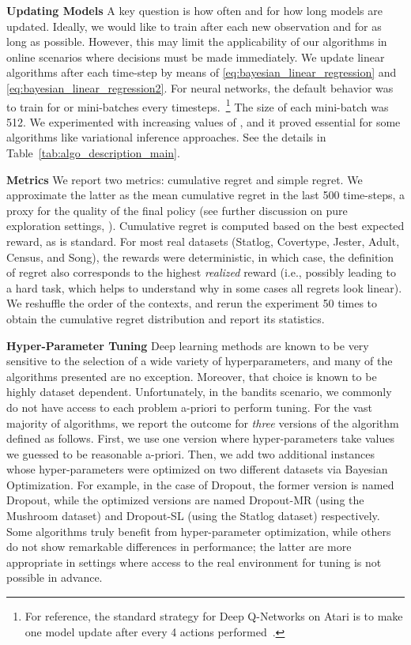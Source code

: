 \documentclass{article} \usepackage{iclr2018_conference,times}
\begin{document}
\textbf{Updating Models}
A key question is how often and for how long models are updated.
Ideally, we would like to train after each new observation and for as long as possible.
However, this may limit the applicability of our algorithms in online scenarios where decisions must be made immediately.
We update linear algorithms after each time-step by means of \eqref{eq:bayesian_linear_regression} and \eqref{eq:bayesian_linear_regression2}.
For neural networks, the default behavior was to train for  or  mini-batches every  timesteps.~\footnote{For reference, the standard strategy for Deep Q-Networks on Atari is to make one model update after every 4 actions performed~\citep{mnih2015,osband2016deep,Plappert17,Fortunato2017}.}
The size of each mini-batch was 512.
We experimented with increasing values of , and it proved essential for some algorithms like variational inference approaches.
See the details in Table~\ref{tab:algo_description_main}.

\textbf{Metrics}  We report two metrics: cumulative regret and simple regret.
We approximate the latter as the mean cumulative regret in the last 500 time-steps, a proxy for the quality of the final policy (see further discussion on pure exploration settings, \cite{bubeck2009pure}).
Cumulative regret is computed based on the best expected reward, as is standard.
For most real datasets (Statlog, Covertype, Jester, Adult, Census, and Song), the rewards were deterministic, in which case, the definition of regret also corresponds to the highest \emph{realized} reward (i.e., possibly leading to a hard task, which helps to understand why in some cases all regrets look linear).
We reshuffle the order of the contexts, and rerun the experiment 50 times to obtain the cumulative regret distribution and report its statistics.


\textbf{Hyper-Parameter Tuning} Deep learning methods are known to be very sensitive to the selection of a wide variety of hyperparameters, and many of the algorithms presented are no exception.  Moreover, that choice is known to be highly dataset dependent.  Unfortunately, in the bandits scenario, we commonly do not have access to each problem a-priori to perform tuning.
For the vast majority of algorithms, we report the outcome for \emph{three} versions of the algorithm defined as follows.
First, we use one version where hyper-parameters take values we guessed to be reasonable a-priori.
Then, we add two additional instances whose hyper-parameters were optimized on two different datasets via Bayesian Optimization.
For example, in the case of Dropout, the former version is named Dropout, while the optimized versions are named Dropout-MR (using the Mushroom dataset) and Dropout-SL (using the Statlog dataset) respectively.
Some algorithms truly benefit from hyper-parameter optimization, while others do not show remarkable differences in performance; the latter are more appropriate in settings where access to the real environment for tuning is not possible in advance.
\end{document}
